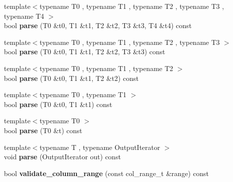 \begin{DoxyCompactItemize}
\item 
\hypertarget{classstrtk_1_1token__grid_1_1row__type_ae5539369ee3f93620a0193a8b80cbadd}{{\footnotesize template$<$typename T0 , typename T1 , typename T2 , typename T3 , typename T4 $>$ }\\bool {\bfseries parse} (T0 \&t0, T1 \&t1, T2 \&t2, T3 \&t3, T4 \&t4) const }\label{classstrtk_1_1token__grid_1_1row__type_ae5539369ee3f93620a0193a8b80cbadd}

\item 
\hypertarget{classstrtk_1_1token__grid_1_1row__type_a5dc6fea536f990f2cf622a2f46954b85}{{\footnotesize template$<$typename T0 , typename T1 , typename T2 , typename T3 $>$ }\\bool {\bfseries parse} (T0 \&t0, T1 \&t1, T2 \&t2, T3 \&t3) const }\label{classstrtk_1_1token__grid_1_1row__type_a5dc6fea536f990f2cf622a2f46954b85}

\item 
\hypertarget{classstrtk_1_1token__grid_1_1row__type_ad6f18423cd68f6435cf9534ecbf95228}{{\footnotesize template$<$typename T0 , typename T1 , typename T2 $>$ }\\bool {\bfseries parse} (T0 \&t0, T1 \&t1, T2 \&t2) const }\label{classstrtk_1_1token__grid_1_1row__type_ad6f18423cd68f6435cf9534ecbf95228}

\item 
\hypertarget{classstrtk_1_1token__grid_1_1row__type_a80345e2864f97a53b5cf55039e4ef624}{{\footnotesize template$<$typename T0 , typename T1 $>$ }\\bool {\bfseries parse} (T0 \&t0, T1 \&t1) const }\label{classstrtk_1_1token__grid_1_1row__type_a80345e2864f97a53b5cf55039e4ef624}

\item 
\hypertarget{classstrtk_1_1token__grid_1_1row__type_ab2fd248e08ffca20f603c77ca8223c4e}{{\footnotesize template$<$typename T0 $>$ }\\bool {\bfseries parse} (T0 \&t) const }\label{classstrtk_1_1token__grid_1_1row__type_ab2fd248e08ffca20f603c77ca8223c4e}

\item 
\hypertarget{classstrtk_1_1token__grid_1_1row__type_a8e8fe155994a39a10982c739666d911f}{{\footnotesize template$<$typename T , typename Output\-Iterator $>$ }\\void {\bfseries parse} (Output\-Iterator out) const }\label{classstrtk_1_1token__grid_1_1row__type_a8e8fe155994a39a10982c739666d911f}

\item 
\hypertarget{classstrtk_1_1token__grid_1_1row__type_ab4470f87c0df0e71932884370ebb246a}{bool {\bfseries validate\-\_\-column\-\_\-range} (const col\-\_\-range\-\_\-t \&range) const }\label{classstrtk_1_1token__grid_1_1row__type_ab4470f87c0df0e71932884370ebb246a}


\end{DoxyCompactItemize}
